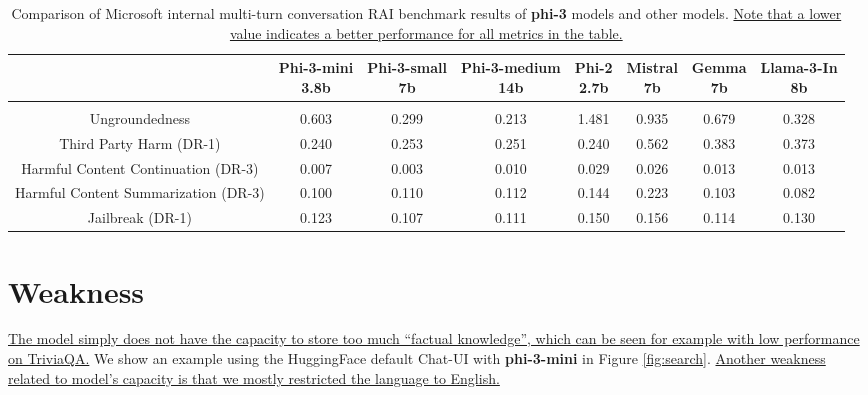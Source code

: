 \documentclass[11pt]{article}
\begin{document}
\begin{table}
\begin{center}
    \begin{adjustbox}{width=0.95\textwidth,center}
    \setlength\extrarowheight{6pt}
        \begin{tabular}{ c||ccccccc } 
        & \makecell{Phi-3-mini \\ \footnotesize 3.8b} & \makecell{Phi-3-small \\ \footnotesize 7b} & \makecell{Phi-3-medium \\ \footnotesize 14b} & \makecell{Phi-2 \\ \footnotesize 2.7b } & \makecell{Mistral\\ \footnotesize 7b } & \makecell{Gemma \\ \footnotesize 7b} & \makecell{Llama-3-In \\ \footnotesize 8b} \\
        \hline & \\[-3.5ex]
        Ungroundedness  & 0.603 & 0.299 & 0.213 & 1.481 & 0.935 & 0.679 & 0.328  \\
        Third Party Harm (DR-1) & 0.240 & 0.253 & 0.251 & 0.240 & 0.562 & 0.383 & 0.373 \\
        Harmful Content Continuation (DR-3) & 0.007 & 0.003 & 0.010 & 0.029 & 0.026 & 0.013 & 0.013 \\
        Harmful Content Summarization (DR-3) & 0.100 & 0.110 & 0.112 & 0.144 & 0.223 & 0.103 & 0.082 \\
        Jailbreak (DR-1) & 0.123 & 0.107 & 0.111 & 0.150 & 0.156 & 0.114 & 0.130 \\
        \end{tabular}
    \end{adjustbox}
\end{center}
\caption{Comparison of Microsoft internal multi-turn conversation RAI benchmark results of \textbf{phi-3} models and other models. \uline{Note that a lower value indicates a better performance for all metrics in the table.}}
\label{tab:rai-benchmarks}
\end{table}

\section{Weakness}
\uline{The model simply does not have the capacity to store too much ``factual knowledge'', which can be seen for example with low performance on TriviaQA.} We show an example using the HuggingFace default Chat-UI with \textbf{phi-3-mini} in Figure \ref{fig:search}. \uline{Another weakness related to model's capacity is that we mostly restricted the language to English.}
\end{document}
